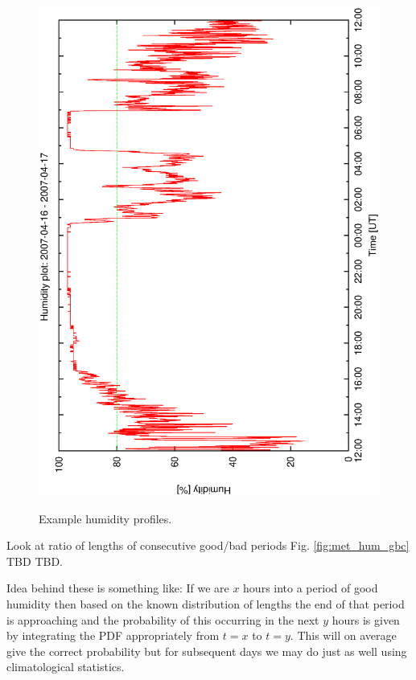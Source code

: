 \begin{figure}[htbp]
\begin{center}
{    \includegraphics[scale=0.25, angle=-90]{figures/ecs/hum_1_2007_04_16.eps}
  }
\end{center}  
\caption{Example humidity profiles.}
\label{fig:humidity_profile_examples}
\end{figure}

Look at ratio of lengths of consecutive good/bad periods Fig. \ref{fig:met_hum_gbc} TBD TBD.

Idea behind these is something like: If we are $x$ hours into a period of good humidity then based on the known distribution of lengths the end of that period is approaching and the probability of this occurring in the next $y$ hours is given by integrating the PDF appropriately from $t=x$ to $t=y$. This will on average give the correct probability but for subsequent days we may do just as well using climatological statistics.

